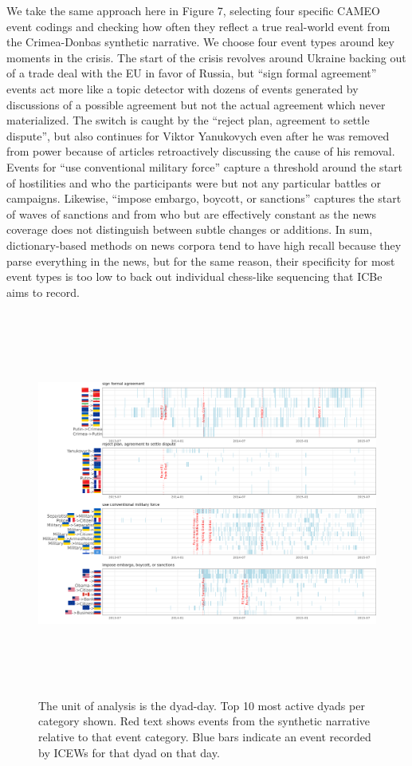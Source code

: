 \documentclass{article}
\begin{document}
We take the same approach here in Figure 7, selecting four specific
CAMEO event codings and checking how often they reflect a true
real-world event from the Crimea-Donbas synthetic narrative. We choose
four event types around key moments in the crisis. The start of the
crisis revolves around Ukraine backing out of a trade deal with the EU
in favor of Russia, but ``sign formal agreement'' events act more like a
topic detector with dozens of events generated by discussions of a
possible agreement but not the actual agreement which never
materialized. The switch is caught by the ``reject plan, agreement to
settle dispute'', but also continues for Viktor Yanukovych even after he
was removed from power because of articles retroactively discussing the
cause of his removal. Events for ``use conventional military force''
capture a threshold around the start of hostilities and who the
participants were but not any particular battles or campaigns. Likewise,
``impose embargo, boycott, or sanctions'' captures the start of waves of
sanctions and from who but are effectively constant as the news coverage
does not distinguish between subtle changes or additions. In sum,
dictionary-based methods on news corpora tend to have high recall
because they parse everything in the news, but for the same reason,
their specificity for most event types is too low to back out individual
chess-like sequencing that ICBe aims to record.

\begin{figure}
\hypertarget{fig-precision-icews}{%
\centering
\includegraphics[width=7in,height=5in]{p_precision_icews.png}
\caption{The unit of analysis is the dyad-day. Top 10 most active dyads
per category shown. Red text shows events from the synthetic narrative
relative to that event category. Blue bars indicate an event recorded by
ICEWs for that dyad on that day.}\label{fig-precision-icews}
}
\end{figure}
\end{document}
